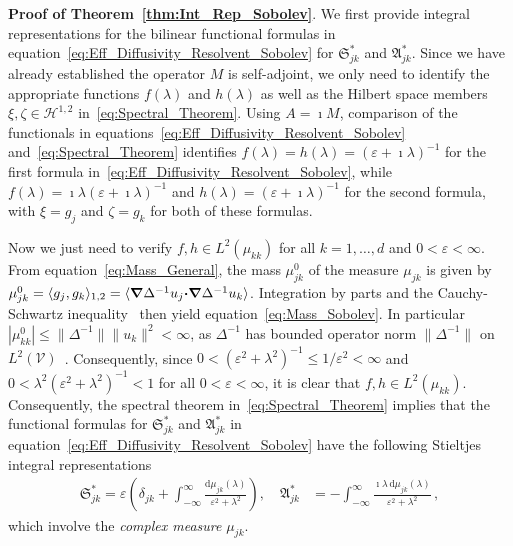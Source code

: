 \documentclass[english,12pt,jmp,graphicx]{revtex4-1}
\newcommand{\vecg}{\mathfrak{g}}
\newcommand{\thmref}[1]{Theorem~\ref{#1}}
\newcommand{\bnabla}{\mbox{\boldmath${\nabla}$}}
\newcommand{\bcdot}{\mbox{\boldmath${\cdot}$}}
\newcommand{\Vc}{\mathcal{V}}
\newcommand{\Sg}{\mathfrak{S}}
\newcommand{\Ag}{\mathfrak{A}}
\newcommand{\Hs}{\mathscr{H}}
\renewcommand{\d}{\mathrm{d}}
\newcommand{\Qc}{\mathcal{Q}}
\begin{document}
\noindent
\textbf{Proof of \thmref{thm:Int_Rep_Sobolev}}.
We first provide integral representations for the bilinear functional
formulas in equation~\eqref{eq:Eff_Diffusivity_Resolvent_Sobolev} for
$\Sg^*_{jk}$ and $\Ag^*_{jk}$. Since we have 
already established  the operator $M$ is self-adjoint, we only
need to identify the appropriate functions $f(\lambda)$ and
$h(\lambda)$ as well as the Hilbert space members
$\xi,\zeta\in\Hs^{1,2}$ in~\eqref{eq:Spectral_Theorem}.  Using $A=\imath M$, 
comparison of the functionals  in
equations~\eqref{eq:Eff_Diffusivity_Resolvent_Sobolev}
and~\eqref{eq:Spectral_Theorem} identifies
$f(\lambda)=h(\lambda)=(\varepsilon+\imath\lambda)^{-1}$ for the first
formula in~\eqref{eq:Eff_Diffusivity_Resolvent_Sobolev}, while
$f(\lambda)=\imath\lambda(\varepsilon+\imath\lambda)^{-1}$ and
$h(\lambda)=(\varepsilon+\imath\lambda)^{-1}$ for the 
second formula, with $\xi=g_j$ and $\zeta=g_k$ for both of these
formulas.



Now we just need to verify $f,h\in L^2(\mu_{kk})$ for all $k=1,\ldots,d$
and $0<\varepsilon<\infty$. From equation~\eqref{eq:Mass_General}, the
mass $\mu^0_{jk}$ of the measure $\mu_{jk}$ is
given by $\mu^0_{jk}=\langle g_j,g_k \rangle_{1,2}
=\langle\bnabla\Delta^{-1}u_j\bcdot\bnabla\Delta^{-1}u_k\rangle$. Integration
by parts and the Cauchy-Schwartz
inequality~\cite{Folland:99:RealAnalysis} then yield
equation~\eqref{eq:Mass_Sobolev}. In particular
$|\mu^0_{kk}|\le\|\Delta^{-1}\|\|u_k\|^2<\infty$, as $\Delta^{-1}$ has
bounded operator norm $\|\Delta^{-1}\|$ on
$L^2(\Vc)$~\cite{Stakgold:BVP:2000}.    
Consequently, since
$0<(\varepsilon^2+\lambda^2)^{-1}\leq1/\varepsilon^2<\infty$ and
$0<\lambda^2(\varepsilon^2+\lambda^2)^{-1}<1$ for all
$0<\varepsilon<\infty$, it is clear that $f,h\in
L^2(\mu_{kk})$. Consequently, the spectral theorem  
in~\eqref{eq:Spectral_Theorem} implies that the functional 
formulas for $\Sg^*_{jk}$ and $\Ag^*_{jk}$ in
equation~\eqref{eq:Eff_Diffusivity_Resolvent_Sobolev} have the 
following Stieltjes integral representations
%
\begin{align}\label{eq:Integral_Rep_Discrete}
  \Sg^*_{jk}=\varepsilon\left(\delta_{jk}+\int_{-\infty}^\infty\frac{\d\mu_{jk}(\lambda)}{\varepsilon^2+\lambda^2}\right),
  \quad
  \Ag^*_{jk}&=-\int_{-\infty}^\infty\frac{\imath\lambda\, \d\mu_{jk}(\lambda)}{\varepsilon^2+\lambda^2}\,,
\end{align}
%
which involve the \emph{complex measure} $\mu_{jk}$.
\end{document}
